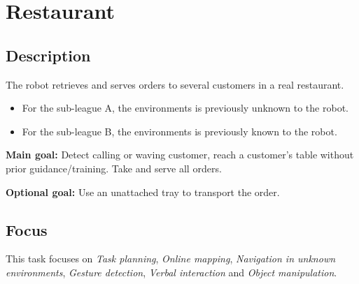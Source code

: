 \section{Restaurant}
\label{test:restaurant}

\subsection*{Description}

The robot retrieves and serves orders to several customers in a real restaurant.

\begin{itemize}
	\item For the sub-league A, the environments is previously unknown to the robot.
	\item For the sub-league B, the environments is previously known to the robot.
\end{itemize}

\textbf{Main goal:}
	Detect calling or waving customer, reach a customer’s table without prior guidance/training. Take and serve all orders.
	
\textbf{Optional goal:}
	Use an unattached tray to transport the order.


\subsection*{Focus}
This task focuses on
\textit{Task planning},
\textit{Online mapping},
\textit{Navigation in unknown environments},
\textit{Gesture detection},
\textit{Verbal interaction} and
\textit{Object manipulation}.	

